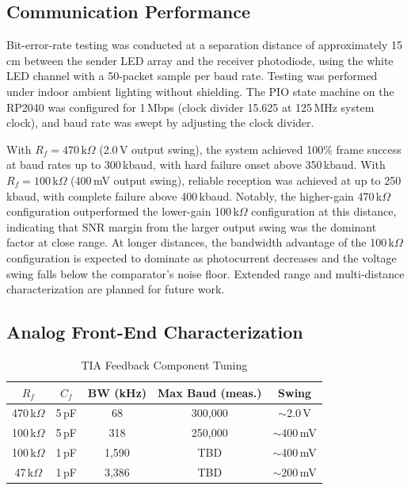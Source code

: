 \documentclass[conference]{IEEEtran}
\begin{document}
\subsection{Communication Performance}

Bit-error-rate testing was conducted at a separation distance of approximately 15\,cm between the sender LED array and the receiver photodiode, using the white LED channel with a 50-packet sample per baud rate. Testing was performed under indoor ambient lighting without shielding. The PIO state machine on the RP2040 was configured for 1\,Mbps (clock divider 15.625 at 125\,MHz system clock), and baud rate was swept by adjusting the clock divider.

With $R_f = 470\,\text{k}\Omega$ (2.0\,V output swing), the system achieved 100\% frame success at baud rates up to 300\,kbaud, with hard failure onset above 350\,kbaud. With $R_f = 100\,\text{k}\Omega$ (400\,mV output swing), reliable reception was achieved at up to 250\,kbaud, with complete failure above 400\,kbaud. Notably, the higher-gain 470\,k$\Omega$ configuration outperformed the lower-gain 100\,k$\Omega$ configuration at this distance, indicating that SNR margin from the larger output swing was the dominant factor at close range. At longer distances, the bandwidth advantage of the 100\,k$\Omega$ configuration is expected to dominate as photocurrent decreases and the voltage swing falls below the comparator's noise floor. Extended range and multi-distance characterization are planned for future work.

\subsection{Analog Front-End Characterization}

\begin{table}[htbp]
\caption{TIA Feedback Component Tuning}
\begin{center}
\small
\begin{tabular}{|c|c|c|c|c|}
\hline
$R_f$ & $C_f$ & \textbf{BW (kHz)} & \textbf{Max Baud (meas.)} & \textbf{Swing} \\
\hline
470\,k$\Omega$ & 5\,pF & 68 & 300,000 & $\sim$2.0\,V \\
\hline
100\,k$\Omega$ & 5\,pF & 318 & 250,000 & $\sim$400\,mV \\
\hline
100\,k$\Omega$ & 1\,pF & 1,590 & TBD & $\sim$400\,mV \\
\hline
47\,k$\Omega$ & 1\,pF & 3,386 & TBD & $\sim$200\,mV \\
\hline
\end{tabular}
\label{tab:tia_tuning}
\end{center}
\end{table}
\end{document}
